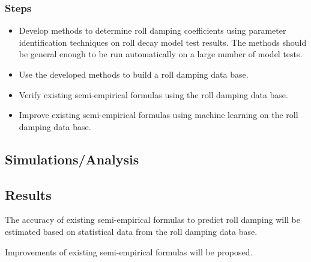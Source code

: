 \subsubsection{Steps}
\begin{itemize}
	\item Develop methods to determine roll damping coefficients using parameter identification techniques on roll decay model test results. The methods should be general enough to be run automatically on a large number of model tests.
    \item Use the developed methods to build a roll damping data base.
    \item Verify existing semi-empirical formulas using the roll damping data base.
    \item Improve existing semi-empirical formulas using machine learning on the roll damping data base.
\end{itemize}		
			
			
\subsection{Simulations/Analysis}

			
\subsection{Results}
The accuracy of existing semi-empirical formulas to predict roll damping will be estimated based on statistical data from the roll damping data base.

Improvements of existing semi-empirical formulas will be proposed. 